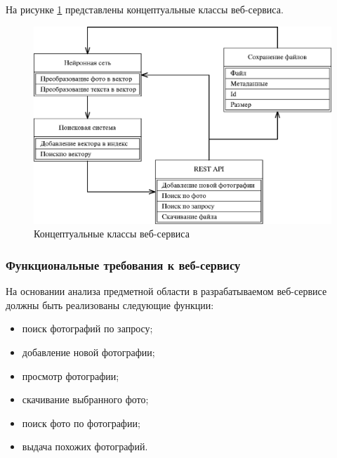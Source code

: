 На рисунке \ref{fig:-conceptual_classes} представлены концептуальные классы веб-сервиса.
\begin{figure}
	\centering
	\includegraphics[width=0.9\linewidth]{"images/Концептуальные-классы"}
	\caption[Концептуальные классы веб-сервиса]{Концептуальные классы веб-сервиса}
	\label{fig:-conceptual_classes}
\end{figure}

\subsubsection{Функциональные требования к веб-сервису}

На основании анализа предметной области в разрабатываемом веб-сервисе должны быть реализованы следующие функции:
\begin{itemize}
	\item поиск фотографий по запросу;
	\item добавление новой фотографии;
	\item просмотр фотографии;
	\item скачивание выбранного фото;
	\item поиск фото по фотографии;
	\item выдача похожих фотографий.
\end{itemize}

